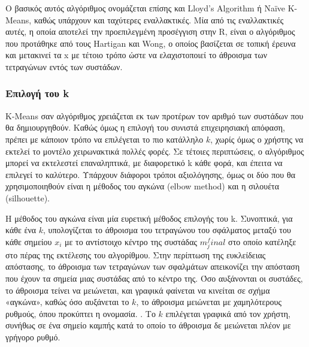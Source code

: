 \documentclass{article}
\begin{document}
Ο βασικός αυτός αλγόριθμος ονομάζεται επίσης και Lloyd’s Algorithm ή Naïve K-Means, καθώς υπάρχουν και ταχύτερες εναλλακτικές. Μία από τις εναλλακτικές αυτές, η οποία αποτελεί την προεπιλεγμένη προσέγγιση στην R, είναι ο αλγόριθμος που προτάθηκε από τους Hartigan και Wong, ο οποίος βασίζεται σε τοπική έρευνα και μετακινεί τα x με τέτοιο τρόπο ώστε να ελαχιστοποιεί το άθροισμα των τετραγώνων εντός των συστάδων. \cite{hartigan1979algorithm}

\subsubsection{Επιλογή του k}

 K-Means σαν αλγόριθμος χρειάζεται εκ των προτέρων τον αριθμό των συστάδων που θα δημιουργηθούν. Καθώς όμως η επιλογή του συνιστά επιχειρησιακή απόφαση, πρέπει με κάποιον τρόπο να επιλέγεται το πιο κατάλληλο $k$, χωρίς όμως ο χρήστης να εκτελεί το μοντέλο χειρωνακτικά πολλές φορές. Σε τέτοιες περιπτώσεις, ο αλγόριθμος μπορεί να εκτελεστεί επαναληπτικά, με διαφορετικό k κάθε φορά, και έπειτα να επιλεγεί το καλύτερο. Υπάρχουν διάφοροι τρόποι αξιολόγησης, όμως οι δύο που θα χρησιμοποιηθούν είναι η μέθοδος του αγκώνα (elbow method) και η σιλουέτα (silhouette).

Η μέθοδος του αγκώνα είναι μία ευρετική μέθοδος επιλογής του k. Συνοπτικά, για κάθε ένα $k$, υπολογίζεται το άθροισμα του τετραγώνου του σφάλματος μεταξύ του κάθε σημείου $x_i$ με το αντίστοιχο κέντρο της συστάδας $m_j^final$ στο οποίο κατέληξε στο πέρας της εκτέλεσης του αλγορίθμου. Στην περίπτωση της ευκλείδειας απόστασης, το άθροισμα των τετραγώνων των σφαλμάτων απεικονίζει την απόσταση που έχουν τα σημεία μιας συστάδας από το κέντρο της. Όσο αυξάνονται οι συστάδες, το άθροισμα τείνει να μειώνεται, και γραφικά φαίνεται να κινείται σε σχήμα «αγκώνα», καθώς όσο αυξάνεται το $k$, το άθροισμα μειώνεται με χαμηλότερους ρυθμούς, όπου προκύπτει η ονομασία. \cite{syakur2018integration}. Το $k$ επιλέγεται γραφικά από τον χρήστη, συνήθως σε ένα σημείο καμπής κατά το οποίο το άθροισμα δε μειώνεται πλέον με γρήγορο ρυθμό.
\end{document}
